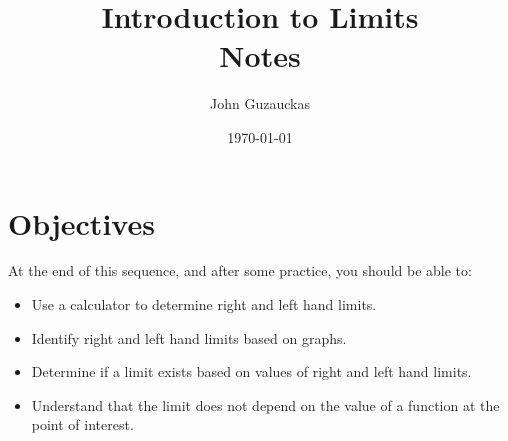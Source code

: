 \documentclass{article}
\title{Introduction to Limits \\ Notes}
\author{John Guzauckas}
\date{\today}
\begin{document}
\maketitle

\section{Objectives}
At the end of this sequence, and after some practice, you should be able to:
\begin{itemize}
    \item Use a calculator to determine right and left hand limits.
    \item Identify right and left hand limits based on graphs.
    \item Determine if a limit exists based on values of right and left hand limits.
    \item Understand that the limit does not depend on the value of a function at the point of interest.
\end{itemize}

\pagebreak
\end{document}
